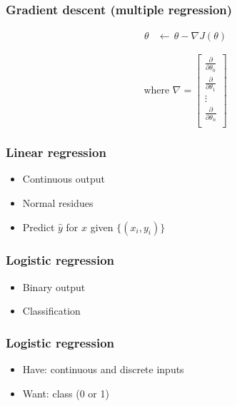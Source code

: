\begin{frame}
  \frametitle{Gradient descent (multiple regression)}

  \begin{bphrase}
    \begin{align*}
      \theta & \leftarrow\, \theta - \nabla J(\theta)
    \end{align*}

    \begin{displaymath}
      \mbox{where } \nabla =
      \begin{bmatrix}
        \frac{\partial}{\partial\theta_0} \\[2mm]
        \frac{\partial}{\partial\theta_1} \\[2mm]
        \vdots\\[2mm]
        \frac{\partial}{\partial\theta_n} \\
      \end{bmatrix}
    \end{displaymath}
  \end{bphrase}
\end{frame}


\begin{frame}
  \frametitle{Linear regression}
  \begin{bphrase}
    \begin{itemize}
    \item Continuous output
    \item Normal residues
    \item Predict $\hat{y}$ for $x$ given $\{(x_i, y_i)\}$
    \end{itemize}
  \end{bphrase}
\end{frame}

\begin{frame}
  \frametitle{Logistic regression}
  \begin{bphrase}
    \begin{itemize}
    \item Binary output
    \item Classification
    \end{itemize}
  \end{bphrase}
\end{frame}

\begin{frame}
  \frametitle{Logistic regression}
  \begin{itemize}
  \item Have: continuous and discrete inputs
  \item Want: class (0 or 1)
  \end{itemize}
\end{frame}

